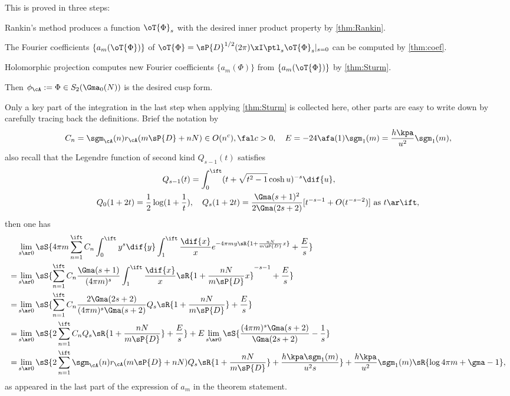 \documentclass[a4paper, twoside]{article}
\begin{document}
\begin{prf}
	This is proved in three steps:
	\begin{enr}
		\item Rankin's method produces a function $\oT{\Phi}_{s}$ with the desired inner product property by \cref{thm:Rankin}.
		\item The Fourier coefficients $\{a_{m}(\oT{\Phi})\}$ of $\oT{\Phi}=\sP{D}^{1/2}(2\pi)\xI\ptl_{s}\oT{\Phi}_{s}|_{s=0}$ can be computed by \cref{thm:coef}.
		\item Holomorphic projection computes new Fourier coefficients $\{a_{m}(\Phi)\}$ from $\{a_{m}(\oT{\Phi})\}$ by \cref{thm:Sturm}.
	\end{enr}
	Then $\phi_{\cA}:=\Phi\in S_{2}(\Gma_{0}(N))$ is the desired cusp form.


	Only a key part of the integration in the last step when applying \cref{thm:Sturm} is collected here, other parts are easy to write down by carefully tracing back the definitions. Brief the notation by
	\[
		C_{n}=\sgm_{\cA}(n)r_{\cA}(m\sP{D}+nN)\in O(n^{c}),\fal c>0,\quad E=-24\afa(1)\sgm_{1}(m)=\frac{h\kpa}{u^{2}}\sgm_{1}(m),
	\]
	also recall that the Legendre function of second kind $Q_{s-1}(t)$ satisfies
	\begin{align*}
	  Q_{s-1}(t)&=\int_{0}^{\ift}(t+\sqrt{t^{2}-1}\cosh u)^{-s}\dif{u},\\
	  Q_{0}(1+2t)=\frac{1}{2}\log(1+\frac{1}{t})&, \quad Q_{s}(1+2t)=\frac{\Gma(s+1)^{2}}{2\Gma(2s+2)}[t^{-s-1}+O(t^{-s-2})]\text{ as $t\ar\ift$},
	\end{align*}
	then one has
	\begin{align*}
	  &\lim_{s\ar 0}\sS{4\pi m\sum_{n=1}^{\ift}C_{n}\int_{0}^{\ift}y^{s}\dif{y}\int_{1}^{\ift}\frac{\dif{x}}{x}e^{-4\pi my\sR{1+\frac{nN}{m\sP{D}}x}}+\frac{E}{s}} \\
	  =&\lim_{s\ar0}\sS{\sum_{n=1}^{\ift}C_{n}\frac{\Gma(s+1)}{(4\pi m)^{s}}\int_{1}^{\ift}\frac{\dif{x}}{x}\sR{1+\frac{nN}{m\sP{D}}x}^{-s-1}+\frac{E}{s}}\\
	  =&\lim_{s\ar 0}\sS{\sum_{n=1}^{\ift}C_{n}\frac{2\Gma(2s+2)}{(4\pi m)^{s}\Gma(s+2)}Q_{s}\sR{1+\frac{nN}{m\sP{D}}}+\frac{E}{s}} \\
	  =&\lim_{s\ar0}\sS{2\sum_{n=1}^{\ift}C_{n}Q_{s}\sR{1+\frac{nN}{m\sP{D}}}+\frac{E}{s}}+E\lim_{s\ar0}\sS{\frac{(4\pi m)^{s}\Gma(s+2)}{\Gma(2s+2)}-\frac{1}{s}}\\
	  =&\lim_{s\ar0}\sS{2\sum_{n=1}^{\ift}\sgm_{\cA}(n)r_{\cA}(m\sP{D}+nN)Q_{s}\sR{1+\frac{nN}{m\sP{D}}}+\frac{h\kpa\sgm_{1}(m)}{u^{2}s}}+\frac{h\kpa}{u^{2}}\sgm_{1}(m)\sR{\log{4\pi m}+\gma-1},\\
	\end{align*}
	as appeared in the last part of the expression of $a_{m}$ in the theorem statement.
\end{prf}
\end{document}
